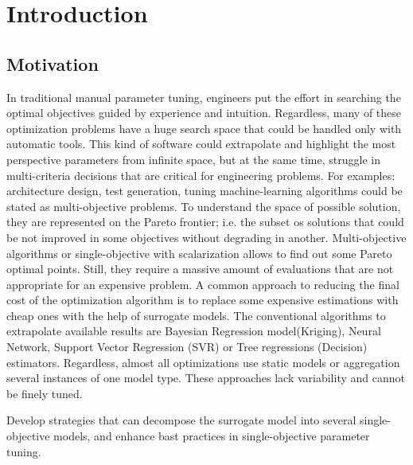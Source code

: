 \chapter{Introduction}\label{sec:intro}

\section{Motivation}

    In traditional manual parameter tuning, engineers put the effort in searching the optimal objectives guided by experience and intuition. Regardless, many of these optimization problems have a huge search space that could be handled only with automatic tools. This kind of software could extrapolate and highlight the most perspective parameters from infinite space, but at the same time, struggle in multi-criteria decisions that are critical for engineering problems. For examples: architecture design, test generation, tuning machine-learning algorithms could be stated as multi-objective problems. To understand the space of possible solution, they are represented on the Pareto frontier; i.e. the subset os solutions that could be not improved in some objectives without degrading in another.
    Multi-objective algorithms or single-objective with scalarization allows to find out some Pareto optimal points. Still, they require a massive amount of evaluations that are not appropriate for an expensive problem. A common approach to reducing the final cost of the optimization algorithm is to replace some expensive estimations with cheap ones with the help of surrogate models. The conventional algorithms to extrapolate available results are Bayesian Regression model(Kriging), Neural Network, Support Vector Regression (SVR) or Tree regressions (Decision) estimators. Regardless, almost all optimizations use static models or aggregation several instances of one model type. These approaches lack variability and cannot be finely tuned.



    Develop strategies that can decompose the surrogate model into several single-objective models, and enhance bast practices in single-objective parameter tuning.

